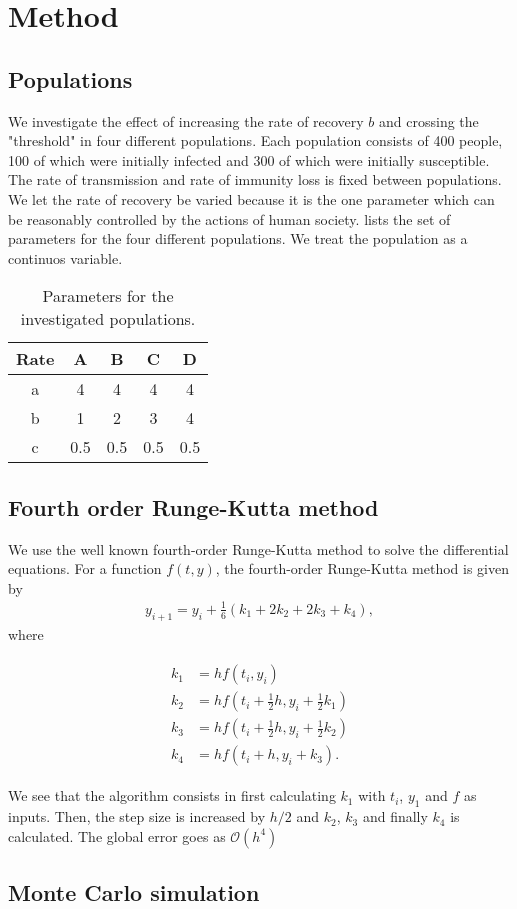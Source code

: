 \documentclass[../main.tex]{subfiles}
\begin{document}
\section{Method}\label{sec:method}
\subsection{Populations}\label{sec:populations}
We investigate the effect of increasing the rate of recovery $b$ and crossing the "threshold" in four different populations. Each population consists of 400 people, 100 of which were initially infected and 300 of which were initially susceptible. The rate of transmission and rate of immunity loss is fixed between populations. We let the rate of recovery be varied because it is the one parameter which can be reasonably controlled by the actions of human society.  lists the set of parameters for the four different populations. We treat the population as a continuos variable. 
\begin{table}[htb]
    \centering
    \caption{Parameters for the investigated populations.}
    \begin{tabular}{c c c c c}
    \toprule
    Rate & A & B & C & D \\
    \midrule
    a & 4 & 4 & 4 & 4 \\
    b & 1 & 2 & 3 & 4 \\
    c & 0.5 & 0.5 & 0.5 & 0.5 \\
    \bottomrule
    \end{tabular}
    \label{tab:parameters}
\end{table}

\subsection{Fourth order Runge-Kutta method}
We use the well known fourth-order Runge-Kutta method to solve the differential equations. For a function \ensuremath{f(t, y)}, the fourth-order Runge-Kutta method is given by
\begin{align}
    y_{i+1}=y_i+\frac{1}{6}(k_1+2k_2+2k_3+k_4), 
    \label{eq:rk4}
\end{align} where

\begin{align}
    \begin{split}
        k_1&=hf(t_i, y_i) \\
        k_2&=hf(t_i+\frac{1}{2}h, y_i+\frac{1}{2}k_1) \\
        k_3&=hf(t_i+\frac{1}{2}h, y_i+\frac{1}{2}k_2)\\
        k_4&=hf(t_i+h, y_i+k_3).
    \end{split}
\end{align}

We see that the algorithm consists in first calculating $k_1$ with $t_i$, $y_1$ and $f$ as inputs. Then, the step size is increased by \ensuremath{h/2} and $k_2$, $k_3$ and finally $k_4$ is calculated. The global error goes as \ensuremath{\mathcal{O}(h^4)}
\subsection{Monte Carlo simulation}
\end{document}
